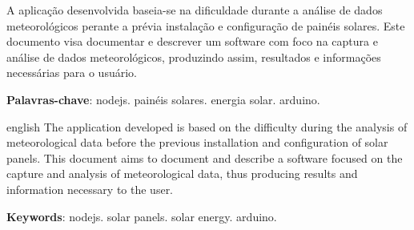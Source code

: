 
\setlength{\absparsep}{18pt} %
\begin{resumo}
  A aplicação desenvolvida baseia-se na dificuldade durante a análise de dados meteorológicos perante a prévia instalação e configuração de painéis solares. Este documento visa documentar e descrever um software com foco na captura e análise de dados meteorológicos, produzindo assim, resultados e informações necessárias para o usuário.

 \textbf{Palavras-chave}: nodejs. painéis solares. energia solar. arduino.
\end{resumo}

\begin{resumo}[Abstract]
 \begin{otherlanguage*}{english}
  The application developed is based on the difficulty during the analysis of meteorological data before the previous installation and configuration of solar panels. This document aims to document and describe a software focused on the capture and analysis of meteorological data, thus producing results and information necessary to the user.

   \vspace{\onelineskip}

   \noindent
   \textbf{Keywords}: nodejs. solar panels. solar energy. arduino.
 \end{otherlanguage*}
\end{resumo}
